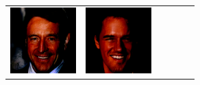 \documentclass{article}
\newcommand{\pganw}{1.0in}
\begin{document}
\begin{table}[htbp]
\begin{center}
\begin{tabular}{cc|cc|cc}
\includegraphics[width=\pganw]{figures/pgan/6_base_iso_MH.png} &
\includegraphics[width=\pganw]{figures/pgan/7_base_iso_MH.png} \\

\end{tabular}
\end{center}
\end{table}
\end{document}
